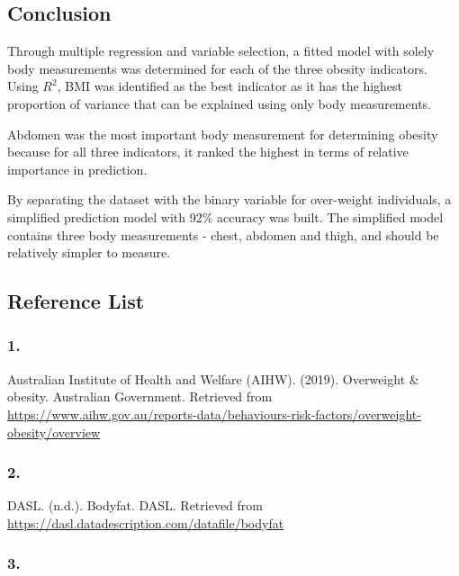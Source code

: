\documentclass[a4paper,9pt,twocolumn,twoside,]{pinp}
\begin{document}
\hypertarget{conclusion}{%
\subsection{Conclusion}\label{conclusion}}

Through multiple regression and variable selection, a fitted model with
solely body measurements was determined for each of the three obesity
indicators. Using \(R^2\), BMI was identified as the best indicator as
it has the highest proportion of variance that can be explained using
only body measurements.

Abdomen was the most important body measurement for determining obesity
because for all three indicators, it ranked the highest in terms of
relative importance in prediction.

By separating the dataset with the binary variable for over-weight
individuals, a simplified prediction model with 92\% accuracy was built.
The simplified model contains three body measurements - chest, abdomen
and thigh, and should be relatively simpler to measure.

\hypertarget{reference-list}{%
\subsection{Reference List}\label{reference-list}}

\hypertarget{section}{%
\subsubsection{1.}\label{section}}

Australian Institute of Health and Welfare (AIHW). (2019). Overweight \&
obesity. Australian Government. Retrieved from
\url{https://www.aihw.gov.au/reports-data/behaviours-risk-factors/overweight-obesity/overview}

\hypertarget{section-1}{%
\subsubsection{2.}\label{section-1}}

DASL. (n.d.). Bodyfat. DASL. Retrieved from
\url{https://dasl.datadescription.com/datafile/bodyfat}

\hypertarget{section-2}{%
\subsubsection{3.}\label{section-2}}
\end{document}
